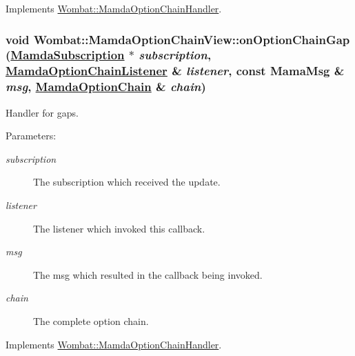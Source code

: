Implements \hyperlink{classWombat_1_1MamdaOptionChainHandler_0f2ed7a5229483349b2c26330a0afb03}{Wombat::Mamda\-Option\-Chain\-Handler}.\hypertarget{classWombat_1_1MamdaOptionChainView_989c1ca9d94e400765440ced2b9ba9a0}{
\subsubsection[onOptionChainGap]{\setlength{\rightskip}{0pt plus 5cm}void Wombat::Mamda\-Option\-Chain\-View::on\-Option\-Chain\-Gap (\hyperlink{classWombat_1_1MamdaSubscription}{Mamda\-Subscription} $\ast$ {\em subscription}, \hyperlink{classWombat_1_1MamdaOptionChainListener}{Mamda\-Option\-Chain\-Listener} \& {\em listener}, const Mama\-Msg \& {\em msg}, \hyperlink{classWombat_1_1MamdaOptionChain}{Mamda\-Option\-Chain} \& {\em chain})}}
\label{classWombat_1_1MamdaOptionChainView_989c1ca9d94e400765440ced2b9ba9a0}


Handler for gaps. 

\begin{Desc}
\item[Parameters:]
\begin{description}
\item[{\em subscription}]The subscription which received the update. \item[{\em listener}]The listener which invoked this callback. \item[{\em msg}]The msg which resulted in the callback being invoked. \item[{\em chain}]The complete option chain. \end{description}
\end{Desc}


Implements \hyperlink{classWombat_1_1MamdaOptionChainHandler_336567cf64826492141bbd7eb010b840}{Wombat::Mamda\-Option\-Chain\-Handler}.